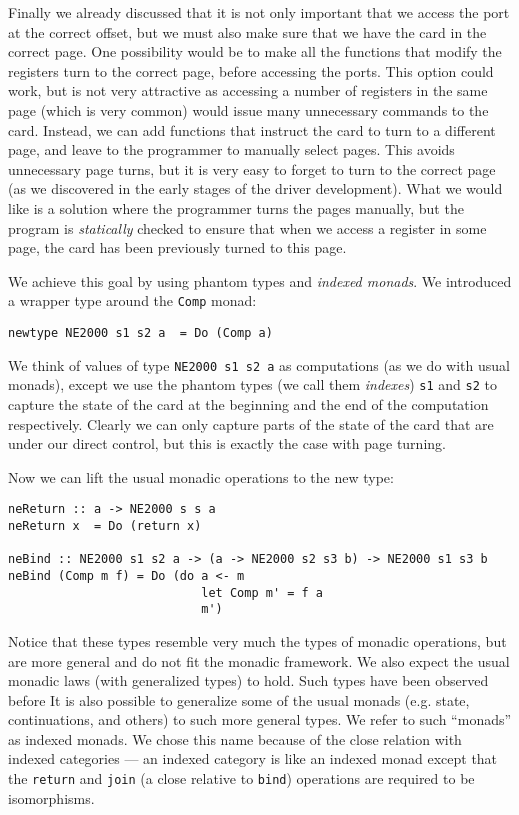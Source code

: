 \documentclass{article}
\begin{document}
Finally we already discussed that it is not only important that we access 
the port at the correct offset, but we must also make sure that we have 
the card in the correct page.  One possibility would be to make all the 
functions that modify the registers turn to the correct page, before 
accessing the ports.  This option could work, but is not very 
attractive as accessing a number of registers in the same page 
(which is very common) would issue many unnecessary commands to the card.
Instead, we can add functions that instruct the card to turn to a 
different page, and leave to the programmer to manually select pages.  
This avoids unnecessary page turns, but it is very easy to forget to 
turn to the correct page (as we discovered in the early stages of the 
driver development).  What we would like is a solution where the programmer 
turns the pages manually, but the program is {\em statically} checked to 
ensure that when we access a register in some page, 
the card has been previously turned to this page.

We achieve this goal by using phantom types and {\em indexed monads}.
We introduced a wrapper type around the \verb#Comp# monad:
\begin{verbatim}
newtype NE2000 s1 s2 a  = Do (Comp a)
\end{verbatim}
We think of values of type \verb#NE2000 s1 s2 a# as computations 
(as we do with usual monads), except we use the phantom types 
(we call them {\em indexes}) \verb#s1# and \verb#s2# to capture the state 
of the card at the beginning and the end of the computation respectively.
Clearly we can only capture parts of the state of the card that are under 
our direct control, but this is exactly the case with page turning.

Now we can lift the usual monadic operations to the new type:
\begin{verbatim}
neReturn :: a -> NE2000 s s a
neReturn x  = Do (return x) 

neBind :: NE2000 s1 s2 a -> (a -> NE2000 s2 s3 b) -> NE2000 s1 s3 b
neBind (Comp m f) = Do (do a <- m
                           let Comp m' = f a
                           m')
\end{verbatim}
Notice that these types resemble very much the types of monadic operations,
but are more general and do not fit the monadic framework. 
We also expect the usual monadic laws (with generalized types) to hold.
Such types have been observed before \cite{Wadler:1994,Wadler:2003}
It is also possible to generalize some of the usual monads 
(e.g. state, continuations, and others) to such more general types.  
We refer to such ``monads'' as indexed monads.  We chose this name 
because of the close relation with indexed categories \cite{CategoricalLogic} 
--- an indexed category is like an indexed monad except 
that the \verb#return# and \verb#join# (a close relative to \verb#bind#) 
operations are required to be isomorphisms.
\end{document}
